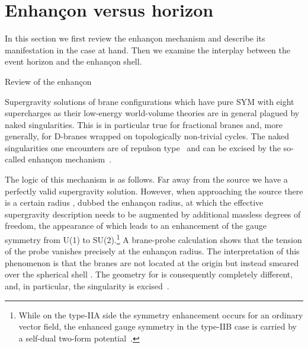 \documentclass[a4paper,11pt]{article}
\makeatletter
\renewcommand{\subsection}{\@startsection{subsection}{2}{\z@} {-3.25ex
plus -1ex minus -.2ex}{1.5ex plus .2ex}{\normalsize\bf}}
\makeatother
\begin{document}
\vspace{1ex}
\section{Enhan\c{c}on versus horizon}
\label{sect:enhancon}

In this section we first review the enhan\c{c}on mechanism and
describe its manifestation in the case at hand. Then we examine the
interplay between the event horizon and the enhan\c{c}on shell.

\subsection{Review of the enhan\c{c}on}

Supergravity solutions of brane configurations which have pure SYM
with eight supercharges as their low-energy world-volume theories are
in general plagued by naked singularities. This is in particular true
for fractional branes and, more generally, for D-branes wrapped on
topologically non-trivial cycles. The naked singularities one
encounters are of repulson
type~\cite{Behrndt:1995tr,Cvetic:1995mx,Kallosh:1995yz} and can be
excised by the so-called enhan\c{c}on mechanism~\cite{Johnson:1999qt}.

The logic of this mechanism is as follows. Far away from the source we 
have a perfectly valid supergravity solution. However, when approaching 
the source there is a certain radius \coordHE{}, dubbed the enhan\c{c}on radius, 
at which the effective supergravity description needs to be augmented by 
additional massless degrees of freedom, the appearance of which leads to 
an enhancement of the gauge symmetry from U(1) to SU(2).\footnote{While 
on the type-IIA side the symmetry enhancement occurs for an ordinary 
vector field, the enhanced \coordHE{} gauge symmetry in the type-IIB case 
is carried by a self-dual two-form potential~\cite{Witten:1995zh}.}
A brane-probe calculation shows that the tension of the probe vanishes 
precisely at the enhan\c{c}on radius. The interpretation of this phenomenon 
is that the branes are not located at the origin but instead smeared over
the spherical shell \coordHE{}. The geometry for \coordHE{} is consequently 
completely different, and, in particular, the singularity is
excised~\cite{Johnson:1999qt,Johnson:2001wm}.
\end{document}
